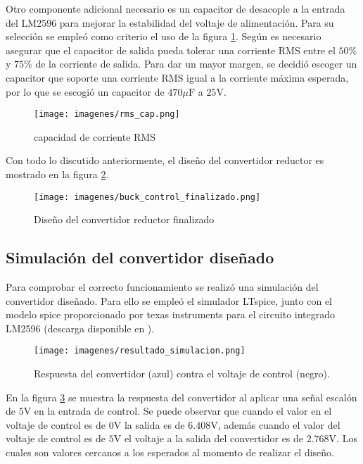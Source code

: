 Otro componente adicional necesario es un capacitor de desacople a la entrada
del LM2596 para mejorar la estabilidad del voltaje de alimentación. Para su
selección se empleó como criterio el uso de la figura \ref{fig:rms_cap}. Según
\cite{lm2596} es necesario asegurar que el capacitor de salida pueda tolerar
una corriente RMS entre el $50\%$ y $75\%$ de la corriente de salida.
Para dar un mayor margen, se decidió escoger un capacitor que soporte una corriente
RMS igual a la corriente máxima esperada, por lo que se escogió un capacitor
de $470\mu\text{F}$ a $25\text{V}$.

\begin{figure}[t]
    \centering

    \texttt{[image: imagenes/rms\_cap.png]}
    \caption{capacidad de corriente RMS}
    \label{fig:rms_cap}

\end{figure}

Con todo lo discutido anteriormente, el diseño del convertidor reductor es mostrado
en la figura \ref{fig:buck_finalizado}.

\begin{figure}[H]
    \centering

    \texttt{[image: imagenes/buck\_control\_finalizado.png]}
    \caption{Diseño del convertidor reductor finalizado}
    \label{fig:buck_finalizado}
\end{figure}

\subsection{Simulación del convertidor diseñado}

Para comprobar el correcto funcionamiento se realizó una simulación del 
convertidor diseñado. Para ello se empleó el simulador LTspice, junto con 
el modelo spice proporcionado por texas instruments para el circuito integrado
LM2596 (descarga disponible en \cite{noauthor_lm2596_nodate}). 

\begin{figure}[H]
    \centering
    \texttt{[image: imagenes/resultado\_simulacion.png]}
    \caption{Respuesta del convertidor (azul) contra el voltaje de control
            (negro).}
    \label{fig:sim_buck}
\end{figure}

En la figura \ref{fig:sim_buck} se muestra la respuesta del convertidor al
aplicar una señal escalón de $5\text{V}$ en la entrada de control. Se puede
observar que cuando el valor en el voltaje de control es de $0\text{V}$
la salida es de $6.408\text{V}$, además
cuando el valor del voltaje de control es de $5\text{V}$ el voltaje a la salida
del convertidor es de $2.768\text{V}$. Los cuales son valores cercanos a los esperados
al momento de realizar el diseño. 

